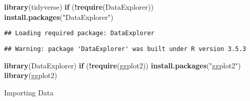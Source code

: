 \documentclass[]{article}
\newenvironment{Shaded}{\begin{snugshade}}{\end{snugshade}}
\newcommand{\KeywordTok}[1]{\textcolor[rgb]{0.13,0.29,0.53}{\textbf{#1}}}
\newcommand{\DataTypeTok}[1]{\textcolor[rgb]{0.13,0.29,0.53}{#1}}
\newcommand{\DecValTok}[1]{\textcolor[rgb]{0.00,0.00,0.81}{#1}}
\newcommand{\StringTok}[1]{\textcolor[rgb]{0.31,0.60,0.02}{#1}}
\newcommand{\OtherTok}[1]{\textcolor[rgb]{0.56,0.35,0.01}{#1}}
\newcommand{\ControlFlowTok}[1]{\textcolor[rgb]{0.13,0.29,0.53}{\textbf{#1}}}
\newcommand{\OperatorTok}[1]{\textcolor[rgb]{0.81,0.36,0.00}{\textbf{#1}}}
\newcommand{\NormalTok}[1]{#1}
\begin{document}
\begin{Shaded}
\begin{Highlighting}[]
\KeywordTok{library}\NormalTok{(tidyverse)}
\ControlFlowTok{if}\NormalTok{ (}\OperatorTok{!}\KeywordTok{require}\NormalTok{(DataExplorer)) }\KeywordTok{install.packages}\NormalTok{(}\StringTok{"DataExplorer"}\NormalTok{)}
\end{Highlighting}
\end{Shaded}

\begin{verbatim}
## Loading required package: DataExplorer
\end{verbatim}

\begin{verbatim}
## Warning: package 'DataExplorer' was built under R version 3.5.3
\end{verbatim}

\begin{Shaded}
\begin{Highlighting}[]
\KeywordTok{library}\NormalTok{(DataExplorer)}
\ControlFlowTok{if}\NormalTok{ (}\OperatorTok{!}\KeywordTok{require}\NormalTok{(ggplot2)) }\KeywordTok{install.packages}\NormalTok{(}\StringTok{"ggplot2"}\NormalTok{)}
\KeywordTok{library}\NormalTok{(ggplot2)}
\end{Highlighting}
\end{Shaded}

Importing Data

\begin{Shaded}
\end{Shaded}
\end{document}
